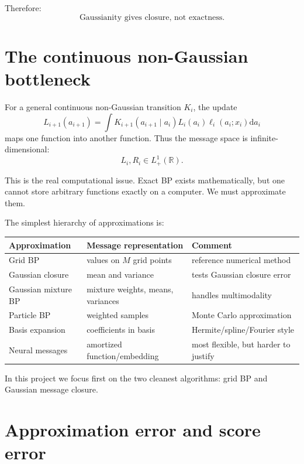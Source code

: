 \documentclass[11pt]{article}
\newcommand{\R}{\mathbb{R}}
\begin{document}
Therefore:
\[
\boxed{\text{Gaussianity gives closure, not exactness.}}
\]

\section{The continuous non-Gaussian bottleneck}

For a general continuous non-Gaussian transition \(K_i\), the update
\begin{equation}
  L_{i+1}(a_{i+1})
  =
  \int
  K_{i+1}(a_{i+1}\mid a_i)
  L_i(a_i)\ell_i(a_i;x_i)
  \mathrm{d}a_i
\end{equation}
maps one function into another function. Thus the message space is infinite-dimensional:
\begin{equation}
  L_i,R_i\in L^1_+(\R).
\end{equation}

This is the real computational issue. Exact BP exists mathematically, but one cannot store arbitrary functions exactly on a computer. We must approximate them.

The simplest hierarchy of approximations is:
\begin{center}
\begin{tabular}{lll}
\toprule
Approximation & Message representation & Comment \\
\midrule
Grid BP & values on \(M\) grid points & reference numerical method \\
Gaussian closure & mean and variance & tests Gaussian closure error \\
Gaussian mixture BP & mixture weights, means, variances & handles multimodality \\
Particle BP & weighted samples & Monte Carlo approximation \\
Basis expansion & coefficients in basis & Hermite/spline/Fourier style \\
Neural messages & amortized function/embedding & most flexible, but harder to justify \\
\bottomrule
\end{tabular}
\end{center}

In this project we focus first on the two cleanest algorithms: grid BP and Gaussian message closure.

\section{Approximation error and score error}
\end{document}

